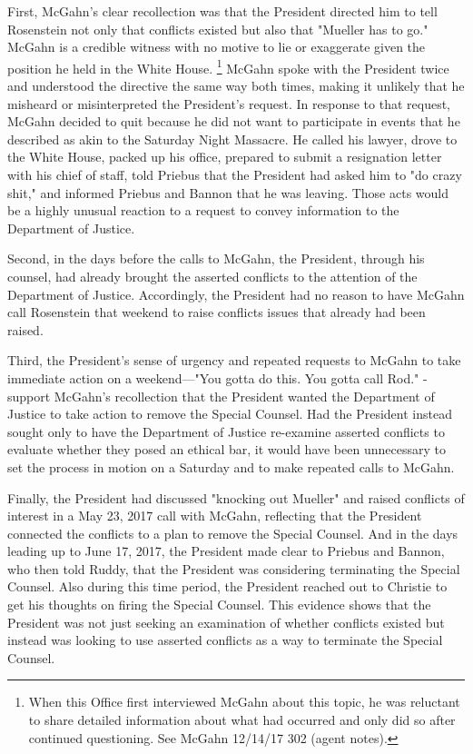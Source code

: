 {First, McGahn's clear recollection was that the President directed him to tell Rosenstein not only that conflicts existed but also that "Mueller has to go."
McGahn is a credible witness with no motive to lie or exaggerate given the position he held in the White House.%
\footnote{When this Office first interviewed McGahn about this topic, he was reluctant to share detailed information about what had occurred and only did so after continued questioning.
See McGahn 12/14/17 302 (agent notes).}
McGahn spoke with the President twice and understood the directive the same way both times, making it unlikely that he misheard or misinterpreted the President's request.
In response to that request, McGahn decided to quit because he did not want to participate in events that he described as akin to the Saturday Night Massacre.
He called his lawyer, drove to the White House, packed up his office, prepared to submit a resignation letter with his chief of staff, told Priebus that the President had asked him to "do crazy shit," and informed Priebus and Bannon that he was leaving.
Those acts would be a highly unusual reaction to a request to convey information to the Department of Justice.

Second, in the days before the calls to McGahn, the President, through his counsel, had already brought the asserted conflicts to the attention of the Department of Justice.
Accordingly, the President had no reason to have McGahn call Rosenstein that weekend to raise conflicts issues that already had been raised.

Third, the President's sense of urgency and repeated requests to McGahn to take immediate action on a weekend---"You gotta do this.
You gotta call Rod."
- support McGahn's recollection that the President wanted the Department of Justice to take action to remove the Special Counsel.
Had the President instead sought only to have the Department of Justice re-examine asserted conflicts to evaluate whether they posed an ethical bar, it would have been unnecessary to set the process in motion on a Saturday and to make repeated calls to McGahn.

Finally, the President had discussed "knocking out Mueller" and raised conflicts of interest in a May 23, 2017 call with McGahn, reflecting that the President connected the conflicts to a plan to remove the Special Counsel.
And in the days leading up to June 17, 2017, the President made clear to Priebus and Bannon, who then told Ruddy, that the President was considering terminating the Special Counsel.
Also during this time period, the President reached out to Christie to get his thoughts on firing the Special Counsel.
This evidence shows that the President was not just seeking an examination of whether conflicts existed but instead was looking to use asserted conflicts as a way to terminate the Special Counsel.

}
